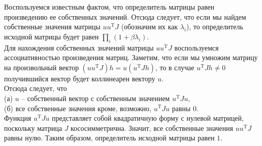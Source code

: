\documentclass{article}
\begin{document}
Воспользуемся известным фактом, что определитель матрицы равен произведению ее собственных значений. Отсюда следует, что если мы найдем собственные значения 
матрицы $u u^{\mathrm{T}} J$ (обозначим их как $\lambda_i$), то определитель исходной матрицы будет равен $\prod\limits_i (1 + \beta \lambda_i)$.\\
Для нахождения собственных значений матрицы $u u^{\mathrm{T}} J$ воспользуемся ассоциативностью произведения матриц. Заметим, что если мы умножим матрицу на произвольный 
вектор $(u u^{\mathrm{T}} J) h = u (u^{\mathrm{T}} J h)$, то в случае $u^{\mathrm{T}} J h \neq 0$ получившийся вектор будет коллинеарен вектору $u$.\\
Отсюда следует, что\\
(а) $u$ -- собственный вектор с собственным значением $u^{\mathrm{T}} J u$,\\
(б) все собственные значения кроме, возможно, $u^{\mathrm{T}} J u$ равны $0$.\\
Функция $u^{\mathrm{T}} J u$ представляет собой квадратичную форму с нулевой матрицей, поскольку матрица $J$ кососимметрична. Значит, все собственные значения $u u^{\mathrm{T}} J$ равны нулю.
Таким образом, определитель исходной матрицы равен $1$.
\end{document}
